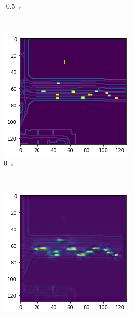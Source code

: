 \documentclass[12pt]{article}
\begin{document}
\begin{figure}[H]
\begin{subfigure}[b]{0.18\textwidth}
                \caption{-0.5~s}
            \end{subfigure}
            ~
            \begin{subfigure}[b]{0.18\textwidth}
                \includegraphics[width=\textwidth]{output_static_brake_2.png}
                \caption{0~s}
            \end{subfigure}
            ~
            \begin{subfigure}[b]{0.18\textwidth}
                \includegraphics[width=\textwidth]{output_static_brake_3.png}

\end{subfigure}
\end{figure}
\end{document}
